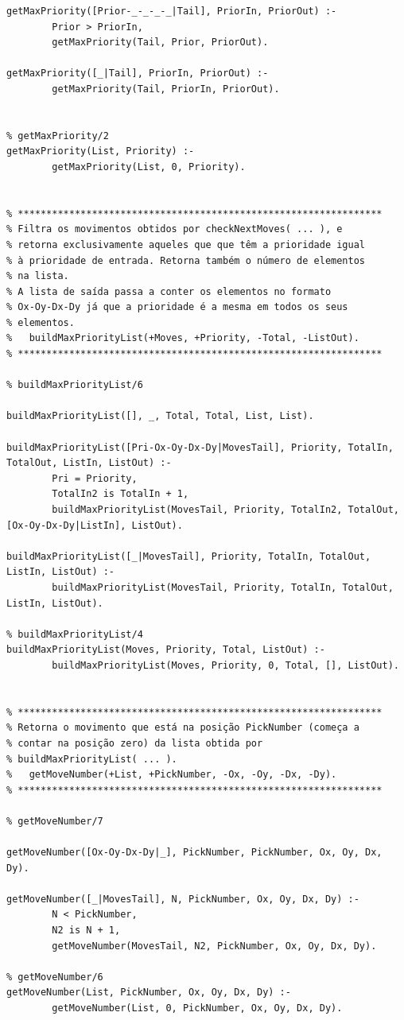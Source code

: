 \documentclass[15pt,a4paper]{article}
\begin{document}
\begin{lstlisting}
getMaxPriority([Prior-_-_-_-_|Tail], PriorIn, PriorOut) :-
		Prior > PriorIn,
		getMaxPriority(Tail, Prior, PriorOut).

getMaxPriority([_|Tail], PriorIn, PriorOut) :-
		getMaxPriority(Tail, PriorIn, PriorOut).

		
% getMaxPriority/2
getMaxPriority(List, Priority) :-
		getMaxPriority(List, 0, Priority).
		

% ****************************************************************
% Filtra os movimentos obtidos por checkNextMoves( ... ), e
% retorna exclusivamente aqueles que que têm a prioridade igual
% à prioridade de entrada. Retorna também o número de elementos
% na lista.
% A lista de saída passa a conter os elementos no formato 
% Ox-Oy-Dx-Dy já que a prioridade é a mesma em todos os seus
% elementos.
%	buildMaxPriorityList(+Moves, +Priority, -Total, -ListOut).
% ****************************************************************

% buildMaxPriorityList/6

buildMaxPriorityList([], _, Total, Total, List, List).

buildMaxPriorityList([Pri-Ox-Oy-Dx-Dy|MovesTail], Priority, TotalIn, TotalOut, ListIn, ListOut) :-
		Pri = Priority,
		TotalIn2 is TotalIn + 1,
		buildMaxPriorityList(MovesTail, Priority, TotalIn2, TotalOut, [Ox-Oy-Dx-Dy|ListIn], ListOut).

buildMaxPriorityList([_|MovesTail], Priority, TotalIn, TotalOut, ListIn, ListOut) :-
		buildMaxPriorityList(MovesTail, Priority, TotalIn, TotalOut, ListIn, ListOut).

% buildMaxPriorityList/4
buildMaxPriorityList(Moves, Priority, Total, ListOut) :-
		buildMaxPriorityList(Moves, Priority, 0, Total, [], ListOut).


% ****************************************************************
% Retorna o movimento que está na posição PickNumber (começa a
% contar na posição zero) da lista obtida por
% buildMaxPriorityList( ... ).
%	getMoveNumber(+List, +PickNumber, -Ox, -Oy, -Dx, -Dy).
% ****************************************************************

% getMoveNumber/7

getMoveNumber([Ox-Oy-Dx-Dy|_], PickNumber, PickNumber, Ox, Oy, Dx, Dy).

getMoveNumber([_|MovesTail], N, PickNumber, Ox, Oy, Dx, Dy) :-
		N < PickNumber,
		N2 is N + 1,
		getMoveNumber(MovesTail, N2, PickNumber, Ox, Oy, Dx, Dy).

% getMoveNumber/6
getMoveNumber(List, PickNumber, Ox, Oy, Dx, Dy) :-
		getMoveNumber(List, 0, PickNumber, Ox, Oy, Dx, Dy).



\end{lstlisting}
\end{document}
